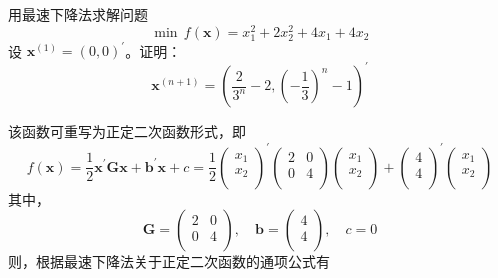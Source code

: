 \documentclass[cn,mtpro2,12pt]{elegantbook}
\begin{document}
\begin{exercise}
    用最速下降法求解问题
    \begin{equation}
        \min\,f(\mathbf{x})=x_{1}^{2}+2x_{2}^{2}+4x_{1}+4x_{2}
    \end{equation}
    设 $\mathbf{x}^{(1)}=\left(0,0\right)^{\prime}$。证明：
    \begin{equation}
        \mathbf{x}^{(n+1)}=\left(\frac{2}{3^{n}}-2,\left(-\frac{1}{3}\right)^{n}-1\right)^{\prime}
    \end{equation}
\end{exercise}

\begin{solution}
    该函数可重写为正定二次函数形式，即
    \begin{equation}
        f(\mathbf{x})=\frac{1}{2}\mathbf{x}^{\prime}\mathbf{G}\mathbf{x}+\mathbf{b}^{\prime}\mathbf{x}+c=\frac{1}{2}\begin{pmatrix}x_{1}\\x_{2}\\\end{pmatrix}^{\prime}\begin{pmatrix}2&0\\0&4\\\end{pmatrix}\begin{pmatrix}x_{1}\\x_{2}\\\end{pmatrix}+\begin{pmatrix}4\\4\\\end{pmatrix}^{\prime}\begin{pmatrix}x_{1}\\x_{2}\\\end{pmatrix}
    \end{equation}
    其中，
    \begin{equation}
        \mathbf{G}=\begin{pmatrix}2&0\\0&4\\\end{pmatrix},\quad\mathbf{b}=\begin{pmatrix}4\\4\\\end{pmatrix},\quad c=0
    \end{equation}
    则，根据最速下降法关于正定二次函数的通项公式有

\end{solution}
\end{document}
